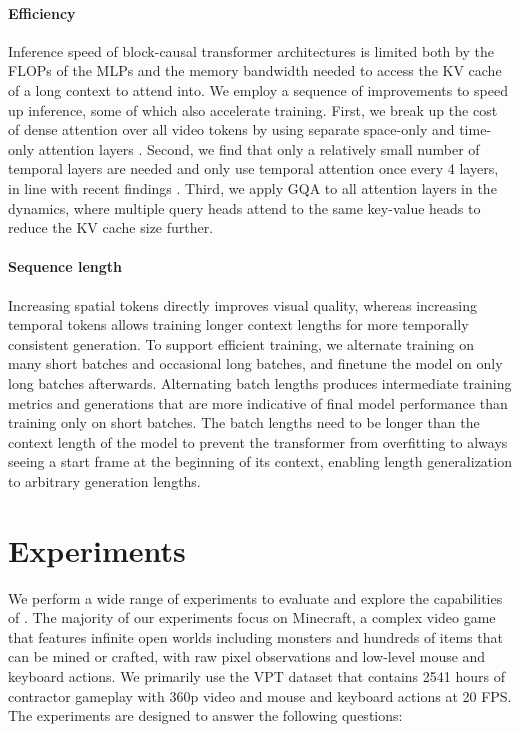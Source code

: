 \documentclass[11pt]{article}
\begin{document}
\paragraph{Efficiency}

Inference speed of block-causal transformer architectures is limited both by the FLOPs of the MLPs and the memory bandwidth needed to access the KV cache of a long context to attend into.
We employ a sequence of improvements to speed up inference, some of which also accelerate training.
First, we break up the cost of dense attention over all video tokens by using separate space-only and time-only attention layers \citep{axial}.
Second, we find that only a relatively small number of temporal layers are needed and only use temporal attention once every 4 layers, in line with recent findings \citep{llama4}.
Third, we apply GQA \citep{gqa} to all attention layers in the dynamics, where multiple query heads attend to the same key-value heads to reduce the KV cache size further.

\paragraph{Sequence length}

Increasing spatial tokens directly improves visual quality, whereas increasing temporal tokens allows training longer context lengths for more temporally consistent generation.
To support efficient training, we alternate training on many short batches and occasional long batches, and finetune the model on only long batches afterwards.
Alternating batch lengths produces intermediate training metrics and generations that are more indicative of final model performance than training only on short batches.
The batch lengths need to be longer than the context length of the model to prevent the transformer from overfitting to always seeing a start frame at the beginning of its context, enabling length generalization to arbitrary generation lengths.

\pagebreak
\section{Experiments}



We perform a wide range of experiments to evaluate and explore the capabilities of \method.
The majority of our experiments focus on Minecraft, a complex video game that features infinite open worlds including monsters and hundreds of items that can be mined or crafted, with raw pixel observations and low-level mouse and keyboard actions.
We primarily use the VPT dataset \citep{vpt} that contains 2541 hours of contractor gameplay with 360p video and mouse and keyboard actions at 20 FPS.
The experiments are designed to answer the following questions:
\end{document}
